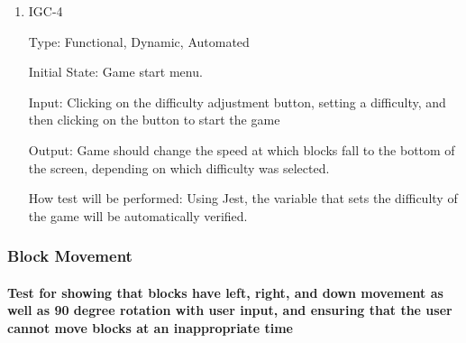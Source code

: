 \documentclass[12pt, titlepage]{article}
\begin{document}
\begin{enumerate}
\item{IGC-4\\}

Type: Functional, Dynamic, Automated
					
Initial State: Game start menu.
					
Input: Clicking on the difficulty adjustment button, setting a difficulty, and then clicking on the button to start the game
					
Output: Game should change the speed at which blocks fall to the bottom of the screen, depending on which difficulty was selected.
					
How test will be performed: Using Jest, the variable that sets the difficulty of the game will be automatically verified.

\end{enumerate}
\subsubsection{Block Movement}
\paragraph{Test for showing that blocks have left, right, and down movement as well as 90 degree rotation with user input, and ensuring that the user cannot move blocks at an inappropriate time}
\end{document}
